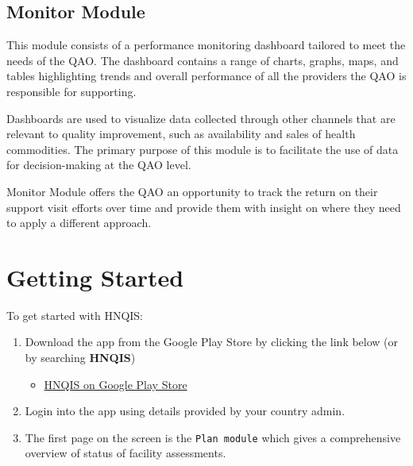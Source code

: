 \documentclass[]{book}
\providecommand{\tightlist}{%
  \setlength{\itemsep}{0pt}\setlength{\parskip}{0pt}}
\begin{document}
\hypertarget{monitor-module}{%
\subsection{Monitor Module}\label{monitor-module}}

This module consists of a performance monitoring dashboard tailored to meet the needs of the QAO. The dashboard contains a range of charts, graphs, maps, and tables highlighting trends and overall performance of all the providers the QAO is responsible for supporting.

Dashboards are used to visualize data collected through other channels that are relevant to quality improvement, such as availability and sales of health commodities. The primary purpose of this module is to facilitate the use of data for decision-making at the QAO level.

Monitor Module offers the QAO an opportunity to track the return on their support visit efforts over time and provide them with insight on where they need to apply a different approach.

\hypertarget{getting-started-1}{%
\section{Getting Started}\label{getting-started-1}}

To get started with HNQIS:

\begin{enumerate}
\def\labelenumi{\arabic{enumi}.}
\tightlist
\item
  Download the app from the Google Play Store by clicking the link below (or by searching \textbf{HNQIS})

  \begin{itemize}
  \tightlist
  \item
    \href{https://play.google.com/store/apps/details?id=org.eyeseetea.malariacare.hnqis_ng}{HNQIS on Google Play Store}
  \end{itemize}
\item
  Login into the app using details provided by your country admin.
\item
  The first page on the screen is the \texttt{Plan\ module} which gives a comprehensive overview of status of facility assessments.
\end{enumerate}
\end{document}
